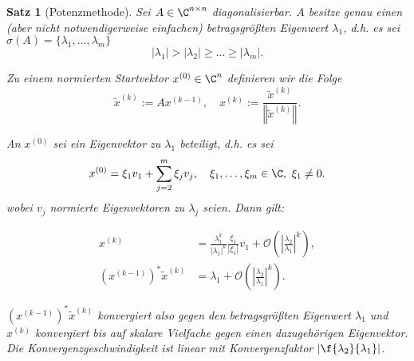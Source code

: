 \documentclass[
]{mycourse}
\theoremstyle{mythm}
\newtheorem{theorem}{Satz}[chapter]
\theoremstyle{break}
\newcommand{\norm}[1]{\left\Vert#1\right\Vert}		%
\begin{document}
\begin{theorem}[Potenzmethode]\label{satz:Potenzmethode}
Sei $A\in \C^{n\times n}$ diagonalisierbar. $A$ besitze genau einen (aber nicht notwendigerweise einfachen) betragsgrößten Eigenwert $\lambda_1$, d.h. es sei
$\sigma(A)=\{\lambda_1,\ldots,\lambda_m\}$
\[
|\lambda_1|> |\lambda_2|\geq \ldots \geq |\lambda_m|.
\] 

Zu einem normierten Startvektor $x^{(0)}\in \C^n$ definieren wir die Folge 
\[
\tilde x^{(k)}:=Ax^{(k-1)}, \quad x^{(k)}:=\frac{\tilde x^{(k)}}{\norm{\tilde x^{(k)}}}.
\]

An $x^{(0)}$ sei ein Eigenvektor zu $\lambda_1$ beteiligt, d.h. 
es sei 
\[
x^{(0)}=\xi_1 v_1 + \sum_{j=2}^m \xi_j v_j, \quad \xi_1,\ldots,\xi_m\in \C,\ \xi_1\neq 0.
\]
wobei $v_j$ normierte Eigenvektoren zu $\lambda_j$ seien. Dann gilt:

\begin{align*}
x^{(k)}&= \frac{\lambda_1^k}{|\lambda_1|^k} \frac{\xi_1}{|\xi_1|} v_1 + \mathcal O(\left| \tfrac {\lambda_2}  {\lambda_1}\right|^k),\\
(x^{(k-1)})^* \tilde x^{(k)} &= \lambda_1 + \mathcal O(\left| \tfrac {\lambda_2}  {\lambda_1}\right|^{k}).
\end{align*}

$(x^{(k-1)})^* \tilde x^{(k)}$ konvergiert also gegen den betragsgrößten Eigenwert $\lambda_1$ und $x^{(k)}$ konvergiert bis auf skalare Vielfache gegen einen dazugehörigen Eigenvektor. Die Konvergenzgeschwindigkeit ist linear mit Konvergenzfaktor $|\f {\lambda_2} {\lambda_1}|$.
\end{theorem}
\end{document}
